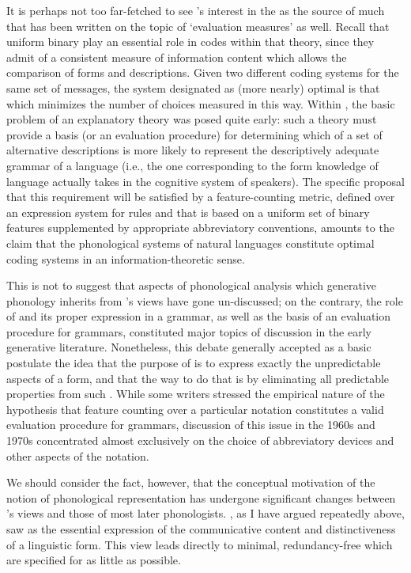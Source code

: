 \largerpage
It is perhaps not too far-fetched to see {\Jakobson}'s interest in the
 as the source of much that has
been written on the topic of `evaluation measures' as well. Recall
that uniform binary  play an essential role in codes within
that theory, since they admit of a consistent measure of information
content which allows the comparison of forms and descriptions. Given
two different coding systems for the same set of messages, the system
designated as (more nearly) optimal is that which minimizes the number
of choices measured in this way. Within , the basic
problem of an explanatory theory was posed quite early: such a theory
must provide a basis (or an evaluation procedure) for determining
which of a set of alternative descriptions is more likely to represent
the descriptively adequate grammar of a language (i.e., the one
corresponding to the form knowledge of language actually takes in the
cognitive system of speakers). The specific proposal that this
requirement will be satisfied by a feature-counting metric, defined
over an expression system for rules and  that is based
on a uniform set of binary features supplemented by appropriate
abbreviatory conventions, amounts to the claim that the phonological
systems of natural languages constitute optimal coding systems in an
information-theoretic sense.

This is not to suggest that aspects of phonological analysis which
generative phonology inherits from {\Jakobson}'s views have gone
un-discussed; on the contrary, the role of  and its proper
expression in a grammar, as well as the basis of an evaluation
procedure for grammars, constituted major topics of discussion in the
early generative literature. Nonetheless, this debate generally
accepted as a basic postulate the idea that the purpose of
 is to express exactly the unpredictable
aspects of a form, and that the way to do that is by eliminating all
predictable properties from such . While some writers
stressed the empirical nature of the hypothesis that feature counting
over a particular notation constitutes a valid evaluation procedure
for grammars, discussion of this issue in the 1960s and 1970s
concentrated almost exclusively on the choice of abbreviatory devices
and other aspects of the notation.

We should consider the fact, however, that the conceptual motivation
of the notion of phonological representation has undergone significant
changes between {\Jakobson}'s views and those of most later
phonologists. {\Jakobson}, as I have argued repeatedly above, saw
 as the essential expression of the
communicative content and distinctiveness of a linguistic form. This
view leads directly to minimal, redundancy-free  which
are specified for as little as possible.

